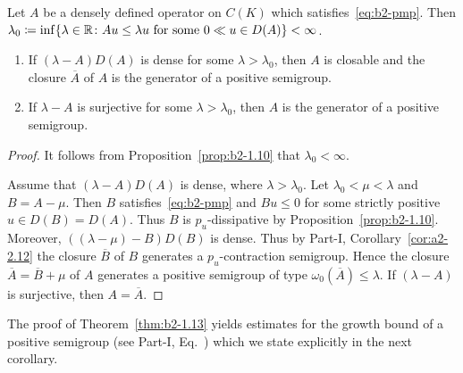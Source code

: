 \begin{theorem}\label{thm:b2-1.13}
Let $A$ be a densely defined operator on $C(K)$ which satisfies~\eqref{eq:b2-pmp}.
Then
$
    \lambda_{0} \coloneq \inf\{\lambda \in \R \colon Au \leq \lambda u \text{ for some } 0 \ll u \in D(A)\} < \infty
$.
\begin{enumerate}[\upshape (i)]
\item \label{thm:b2-1.13-1}
If\/ $(\lambda - A)D(A)$ is dense for some $\lambda > \lambda_{0}$, then $A$ is closable and the closure $\overline{A}$ of\/ $A$ is the generator of a positive semigroup.

\item \label{thm:b2-1.13-2}
If\/ $\lambda - A$ is surjective for some $\lambda > \lambda_{0}$, then $A$ is the generator of a positive semigroup.
\end{enumerate}
\end{theorem}
\begin{proof}
It follows from Proposition~\ref{prop:b2-1.10} that $\lambda_{0} < \infty$.

Assume that $(\lambda - A)D(A)$ is dense, where $\lambda > \lambda_{0}$.
Let $\lambda_{0} < \mu < \lambda$ and $B = A - \mu$.
Then $B$ satisfies~\eqref{eq:b2-pmp} and $Bu \leq 0$ for some strictly positive $u \in D(B) = D(A)$.
Thus $B$ is $p_{u}$-dissipative by Proposition~\ref{prop:b2-1.10}.
Moreover, $((\lambda-\mu) - B)D(B)$ is dense.
Thus by Part-I, Corollary~\ref{cor:a2-2.12} 
the closure $\overline{B}$ of\/ $B$ generates a $p_{u}$-contraction semigroup.
Hence the
closure $\overline{A} = \overline{B} + \mu$ of\/ $A$ generates a positive semigroup of type $\omega_{0}(\overline{A}) \leq \lambda$.
If\/ $(\lambda - A)$ is surjective, then $A = \overline{A}$.
\end{proof}
The proof of Theorem~\ref{thm:b2-1.13} yields estimates for the growth bound of a positive semigroup (see Part-I, Eq.~) which we state explicitly in the next corollary.

